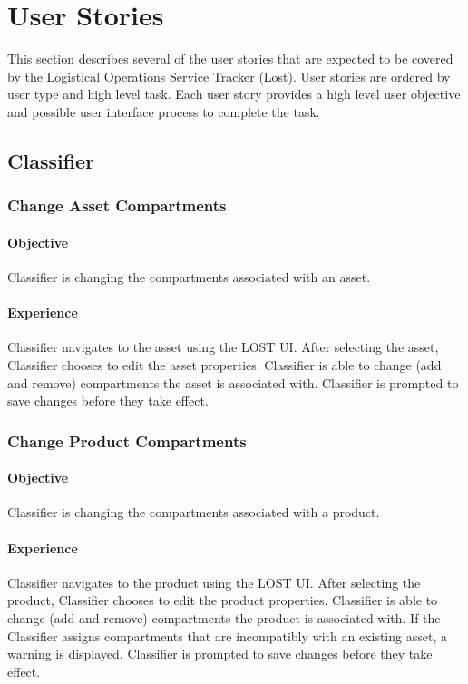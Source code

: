 \chapter*{User Stories}
This section describes several of the user stories that are expected to be covered by the Logistical Operations Service Tracker (Lost). User stories are ordered by user type and high level task. Each user story provides a high level user objective and possible user interface process to complete the task.


\section*{Classifier}
\subsection*{Change Asset Compartments}
\subsubsection*{Objective}
Classifier is changing the compartments associated with an asset.
\subsubsection*{Experience}
Classifier navigates to the asset using the LOST UI. After selecting the asset, Classifier chooses to edit the asset properties. Classifier is able to change (add and remove) compartments the asset is associated with. Classifier is prompted to save changes before they take effect.


\subsection*{Change Product Compartments}
\subsubsection*{Objective}
Classifier is changing the compartments associated with a product.
\subsubsection*{Experience}
Classifier navigates to the product using the LOST UI. After selecting the product, Classifier chooses to edit the product properties. Classifier is able to change (add and remove) compartments the product is associated with. If the Classifier assigns compartments that are incompatibly with an existing asset, a warning is displayed. Classifier is prompted to save changes before they take effect.


